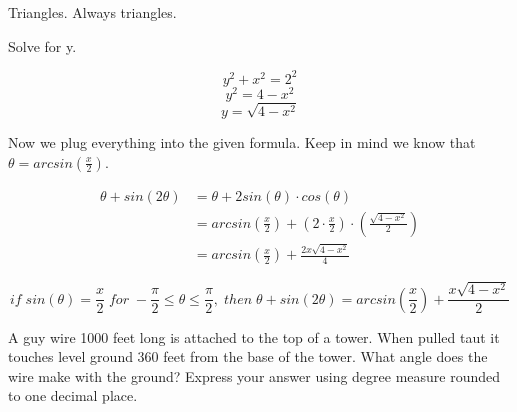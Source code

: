 \documentclass[10pt,letterpaper]{amspset}
\begin{document}
\begin{solution}
    Triangles. Always triangles.
    
    
    Solve for y.
    
    \[ y^2 + x^2 = 2^2 \]
    \[ y^2 = 4 - x^2 \]
    \[ y = \sqrt{4 - x^2} \]
    
    Now we plug everything into the given formula. Keep in mind we know that $\theta = arcsin(\frac{x}{2})$. 
    
    \begin{align}
        \theta + sin(2\theta) &= \theta + 2sin(\theta) \cdot cos(\theta) \\
        &= arcsin \left( \frac{x}{2} \right) + \left( 2 \cdot \frac{x}{2} \right) \cdot \left( \frac{\sqrt{4-x^2}}{2} \right) \\
        &= arcsin \left( \frac{x}{2} \right) + \frac{2x \sqrt{4 - x^2}}{4}
    \end{align}
    
    \[\boxed{ if \; sin(\theta) = \frac{x}{2} \; for \; -\frac{\pi}{2} \leq \theta \leq \frac{\pi}{2}, \; then \; \theta + sin(2\theta) =  arcsin \left( \frac{x}{2} \right) + \frac{x \sqrt{4 - x^2}}{2}  }\]
\end{solution}


\pagebreak


\begin{problem}[211]
    A guy wire 1000 feet long is attached to the top of a tower. When pulled taut it touches level ground 360 feet from the base of the tower. What angle does the wire make with the ground? Express your answer using degree measure rounded to one decimal place.
\end{problem}
\end{document}

